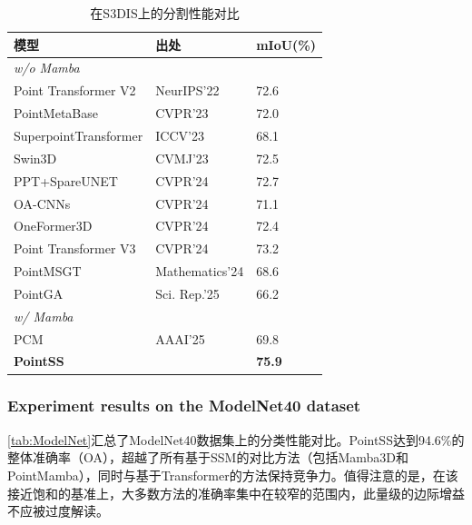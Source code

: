 \documentclass[12pt,a4paper,openany,oneside]{ctexbook}
\theoremstyle{definition}
\theoremstyle{remark}
\begin{document}
\begin{table}[htbp!]
	\caption{在S3DIS上的分割性能对比}
	\label{tab:s3dis}
	\centering
	\begin{tabular}{@{}lll@{}}
		\toprule
		\textbf{模型}           & \textbf{出处} & \textbf{mIoU(\%)} \\ \midrule
		\textit{w/o Mamba} \\
		Point Transformer V2\cite{ptv2}  & NeurIPS'22 & 72.6          \\
		PointMetaBase\cite{pmb}         & CVPR'23 & 72.0          \\
		SuperpointTransformer\cite{spt} & ICCV'23 & 68.1          \\
		Swin3D\cite{Swin3D}                & CVMJ'23 & 72.5          \\
		PPT+SpareUNET\cite{ppt}         & CVPR'24 & 72.7          \\
		OA-CNNs\cite{oacnn}               & CVPR'24 & 71.1          \\
		OneFormer3D\cite{OneFormer3D}           & CVPR'24 & 72.4          \\
		Point Transformer V3\cite{ptv3}           & CVPR'24 & 73.2          \\
		PointMSGT\cite{pointmsgt}      & Mathematics'24 & 68.6         \\
		PointGA\cite{pointga}           & Sci. Rep.'25 & 66.2         \\
		\textit{w/ Mamba} \\
		PCM\cite{pcm}                   & AAAI'25 & 69.8         \\
		\textbf{PointSS}               & & \textbf{75.9}          \\ \bottomrule
	\end{tabular}
	
	
\end{table}


\subsubsection{Experiment results on the ModelNet40 dataset}

\cref{tab:ModelNet}汇总了ModelNet40数据集上的分类性能对比。PointSS达到94.6\%的整体准确率（OA），超越了所有基于SSM的对比方法（包括Mamba3D和PointMamba），同时与基于Transformer的方法保持竞争力。值得注意的是，在该接近饱和的基准上，大多数方法的准确率集中在较窄的范围内，此量级的边际增益不应被过度解读。
\end{document}
